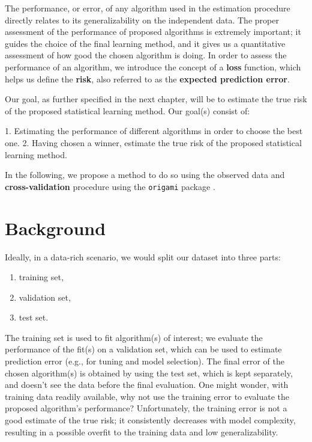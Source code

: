 \documentclass[
  12pt, krantz2,
]{krantz}
\newcommand{\passthrough}[1]{#1}
\providecommand{\tightlist}{%
  \setlength{\itemsep}{0pt}\setlength{\parskip}{0pt}}
\newcommand{\1}{\mathbbm{1}}
\theoremstyle{definition}
\theoremstyle{definition}
\theoremstyle{definition}
\theoremstyle{definition}
\theoremstyle{remark}
\begin{document}
The performance, or error, of any algorithm used in the estimation procedure
directly relates to its generalizability on the independent data. The proper
assessment of the performance of proposed algorithms is extremely important; it
guides the choice of the final learning method, and it gives us a quantitative
assessment of how good the chosen algorithm is doing. In order to assess the
performance of an algorithm, we introduce the concept of a \textbf{loss} function,
which helps us define the \textbf{risk}, also referred to as the \textbf{expected
prediction error}.

\begin{shortbox}
Our goal, as further specified in the next chapter, will be
to estimate the true risk of the proposed statistical learning method. Our
goal(s) consist of:

1. Estimating the performance of different algorithms in order to choose the
   best one.
2. Having chosen a winner, estimate the true risk of the proposed
   statistical learning method.
\end{shortbox}

In the following, we propose a method to do so using the observed data and
\textbf{cross-validation} procedure using the \passthrough{\lstinline!origami!} package \citep{coyle2018origami}.

\hypertarget{background}{%
\section{Background}\label{background}}

Ideally, in a data-rich scenario, we would split our dataset into three parts:

\begin{enumerate}
\def\labelenumi{\arabic{enumi}.}
\tightlist
\item
  training set,
\item
  validation set,
\item
  test set.
\end{enumerate}

The training set is used to fit algorithm(s) of interest; we evaluate the
performance of the fit(s) on a validation set, which can be used to estimate
prediction error (e.g., for tuning and model selection). The final error of the
chosen algorithm(s) is obtained by using the test set, which is kept separately,
and doesn't see the data before the final evaluation. One might wonder, with
training data readily available, why not use the training error to evaluate the
proposed algorithm's performance? Unfortunately, the training error is not a
good estimate of the true risk; it consistently decreases with model complexity,
resulting in a possible overfit to the training data and low generalizability.
\end{document}
